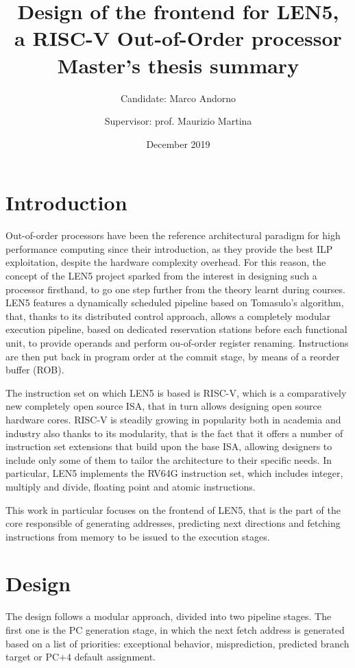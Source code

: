 \documentclass[a4paper,12pt]{article}
\title{Design of the frontend for LEN5,\\a RISC-V Out-of-Order processor\\
  {\Large Master's thesis summary}}
\author{Candidate: Marco Andorno \and Supervisor: prof. Maurizio Martina}
\date{December 2019}
\begin{document}
\maketitle

\section{Introduction}
Out-of-order processors have been the reference architectural paradigm for high performance computing since their introduction, as they provide the best ILP exploitation, despite the hardware complexity overhead. For this reason, the concept of the LEN5 project sparked from the interest in designing such a processor firsthand, to go one step further from the theory learnt during courses. LEN5 features a dynamically scheduled pipeline based on Tomasulo's algorithm, that, thanks to its distributed control approach, allows a completely modular execution pipeline, based on dedicated reservation stations before each functional unit, to provide operands and perform ou-of-order register renaming. Instructions are then put back in program order at the commit stage, by means of a reorder buffer (ROB).

The instruction set on which LEN5 is based is RISC-V, which is a comparatively new completely open source ISA, that in turn allows designing open source hardware cores. RISC-V is steadily growing in popularity both in academia and industry also thanks to its modularity, that is the fact that it offers a number of instruction set extensions that build upon the base ISA, allowing designers to include only some of them to tailor the architecture to their specific needs. In particular, LEN5 implements the RV64G instruction set, which includes integer, multiply and divide, floating point and atomic instructions.

This work in particular focuses on the frontend of LEN5, that is the part of the core responsible of generating addresses, predicting next directions and fetching instructions from memory to be issued to the execution stages.

\section{Design}
The design follows a modular approach, divided into two pipeline stages. The first one is the PC generation stage, in which the next fetch address is generated based on a list of priorities: exceptional behavior, misprediction, predicted branch target or PC$+4$ default assignment.
\end{document}
